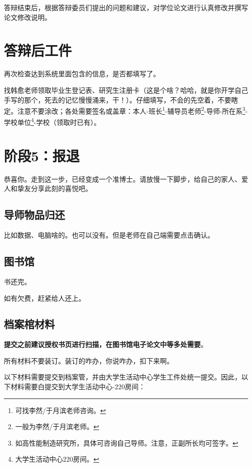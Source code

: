 \documentclass[12pt,a4paper]{ctexart}
\begin{document}
答辩结束后，根据答辩委员们提出的问题和建议，对学位论文进行认真修改并撰写论文修改说明。



\section{答辩后工件}
\label{sec:realpre}

再次检查达到系统里面包含的信息，是否都填写了。

找韩愈老师领取毕业生登记表、研究生注册卡（这是个啥？哈哈，就是你开学自己手写的那个，死去的记忆慢慢涌来，干！）。仔细填写，不会的先空着，不要瞎定。注意不要涂改；各处需要签名或盖章：本人-班长\footnote{可找李然/于月滨老师咨询。}-辅导员老师\footnote{一般为李然/于月滨老师。}-导师-所在系\footnote{如高性能制造研究所，具体可咨询自己导师。注意，正副所长均可签字。}-学校单位\footnote{大学生活动中心220房间。}-学校（领取时已有）。
\section{阶段5：报退}
\label{sec:resign}

恭喜你。走到这一步，已经变成一个准博士。请放慢一下脚步，给自己的家人、爱人和挚友分享此刻的喜悦吧。

\subsection{导师物品归还}
\label{sec:tutorThings}

比如数据、电脑啥的。也可以没有。但是老师在自己端需要点击确认。

\subsection{图书馆}
\label{sec:library}
书还完。

如有欠费，赶紧给人还上。



\subsection{档案棺材料}
\label{sec:archive}


\textbf{提交之前建议授权书页进行扫描，在图书馆电子论文中等多处需要}。

所有材料不要装订。装订的咋办，你说咋办，扣下来啊。

以下材料需要提交到档案管，并由大学生活动中心学生工件处统一提交。因此，以下材料需要白提交到大学生活动中心-220房间：
\end{document}
